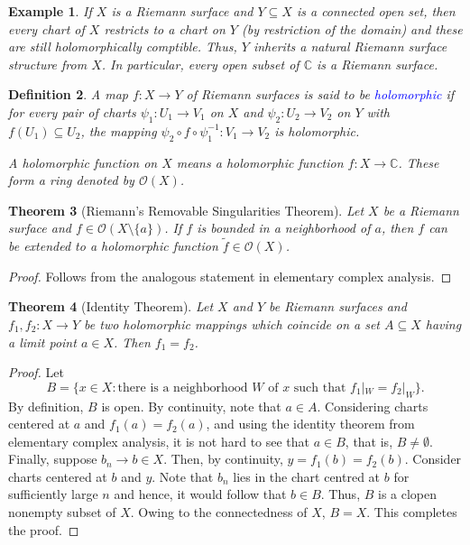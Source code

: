 \documentclass[12pt]{article}
\theoremstyle{thmstyle}
\newtheorem{theorem}{Theorem}[section]
\theoremstyle{defstyle}
\newtheorem{definition}[theorem]{Definition}
\newtheorem{example}[theorem]{Example}
\newcommand{\bbC}{\mathbb{C}}
\newcommand{\wt}[1]{\widetilde{#1}}
\newcommand{\define}[1]{\textcolor{blue}{\textit{#1}}}
\newcommand{\scrO}{\mathscr{O}}
\begin{document}
\begin{example}
    If $X$ is a Riemann surface and $Y\subseteq X$ is a connected open set, then every chart of $X$ restricts to a chart on $Y$ (by restriction of the domain) and these are still holomorphically comptible. Thus, $Y$ inherits a natural Riemann surface structure from $X$. In particular, every open subset of $\bbC$ is a Riemann surface.
\end{example}

\begin{definition}
    A map $f: X\to Y$ of Riemann surfaces is said to be \define{holomorphic} if for every pair of charts $\psi_1: U_1\to V_1$ on $X$ and $\psi_2: U_2\to V_2$ on $Y$ with $f(U_1)\subseteq U_2$, the mapping $\psi_2\circ f\circ\psi_1^{-1}: V_1\to V_2$ is holomorphic.

    A holomorphic function on $X$ means a holomorphic function $f: X\to\bbC$. These form a ring denoted by $\scrO(X)$.
\end{definition}

\begin{theorem}[Riemann's Removable Singularities Theorem]
    Let $X$ be a Riemann surface and $f\in\scrO(X\setminus\{a\})$. If $f$ is bounded in a neighborhood of $a$, then $f$ can be extended to a holomorphic function $\wt f\in\scrO(X)$.
\end{theorem}
\begin{proof}
    Follows from the analogous statement in elementary complex analysis.
\end{proof}

\begin{theorem}[Identity Theorem]
    Let $X$ and $Y$ be Riemann surfaces and $f_1, f_2: X\to Y$ be two holomorphic mappings which coincide on a set $A\subseteq X$ having a limit point $a\in X$. Then $f_1 = f_2$.
\end{theorem}
\begin{proof}
    Let 
    \begin{equation*}
        B = \{x\in X\colon\text{there is a neighborhood } W\text{ of } x\text{ such that } f_1|_W = f_2|_W\}.
    \end{equation*}
    By definition, $B$ is open. By continuity, note that $a\in A$. Considering charts centered at $a$ and $f_1(a) = f_2(a)$, and using the identity theorem from elementary complex analysis, it is not hard to see that $a\in B$, that is, $B\ne\emptyset$. Finally, suppose $b_n\to b\in X$. Then, by continuity, $y = f_1(b) = f_2(b)$. Consider charts centered at $b$ and $y$. Note that $b_n$ lies in the chart centred at $b$ for sufficiently large $n$ and hence, it would follow that $b\in B$. Thus, $B$ is a clopen nonempty subset of $X$. Owing to the connectedness of $X$, $B = X$. This completes the proof.
\end{proof}
\end{document}

